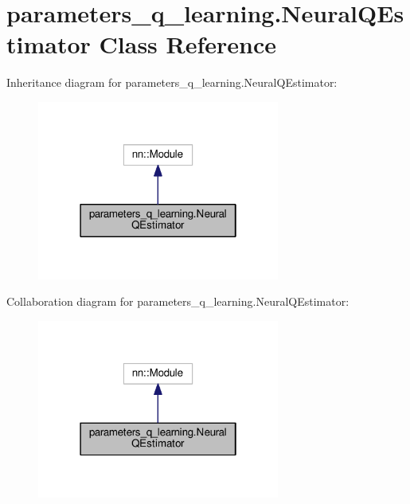 \hypertarget{classparameters__q__learning_1_1_neural_q_estimator}{}\section{parameters\+\_\+q\+\_\+learning.\+Neural\+Q\+Estimator Class Reference}
\label{classparameters__q__learning_1_1_neural_q_estimator}


Inheritance diagram for parameters\+\_\+q\+\_\+learning.\+Neural\+Q\+Estimator\+:
\nopagebreak
\begin{figure}[H]
\begin{center}
\leavevmode
\includegraphics[width=226pt]{classparameters__q__learning_1_1_neural_q_estimator__inherit__graph}
\end{center}
\end{figure}


Collaboration diagram for parameters\+\_\+q\+\_\+learning.\+Neural\+Q\+Estimator\+:
\nopagebreak
\begin{figure}[H]
\begin{center}
\leavevmode
\includegraphics[width=226pt]{classparameters__q__learning_1_1_neural_q_estimator__coll__graph}
\end{center}
\end{figure}
